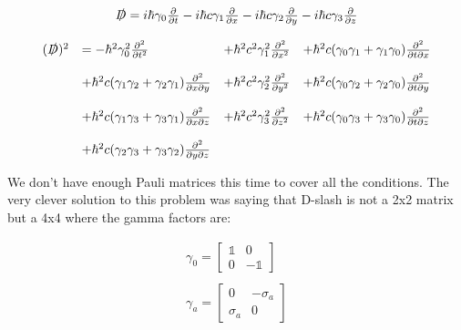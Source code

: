 \begin{equation}
  \begin{array}{c}
    \slashed{D} = i\hbar\gamma_0 \frac{\partial}{\partial t} - i\hbar c \gamma_1 \frac{\partial}{\partial x} - i\hbar c\gamma_2 \frac{\partial}{\partial y} - i\hbar c\gamma_3 \frac{\partial}{\partial z}
    \\

    \\
    \begin{array}{llll}
      (\slashed{D})^2 &= -\hbar^2 \gamma_0^2 \frac{\partial^2}{\partial t^2} &+ \hbar^2 c^2 \gamma_1^2 \frac{\partial^2}{\partial x^2} &+ \hbar^2 c (\gamma_0\gamma_1 + \gamma_1\gamma_0)\frac{\partial^2}{\partial t \partial x}
    \\

    \\
                    &+ \hbar^2 c (\gamma_1\gamma_2 + \gamma_2\gamma_1)\frac{\partial^2}{\partial x \partial y}  &+\hbar^2 c^2 \gamma_2^2 \frac{\partial^2}{\partial y^2}  &+ \hbar^2 c (\gamma_0\gamma_2 + \gamma_2\gamma_0)\frac{\partial^2}{\partial t \partial y}
    \\

    \\
                    &+\hbar^2 c (\gamma_1\gamma_3 + \gamma_3\gamma_1)\frac{\partial^2}{\partial x \partial z}  &+\hbar^2 c^2 \gamma_3^2 \frac{\partial^2}{\partial z^2} &+ \hbar^2 c (\gamma_0\gamma_3 + \gamma_3\gamma_0)\frac{\partial^2}{\partial t \partial z}
    \\

    \\
                    &+\hbar^2 c (\gamma_2\gamma_3 + \gamma_3\gamma_2)\frac{\partial^2}{\partial y \partial z}
    \end{array}
  \end{array}
\end{equation}

We don't have enough Pauli matrices this time to cover all the conditions. The very clever solution to this problem was saying that D-slash is not a 2x2 matrix but a 4x4 where the gamma factors are:

\begin{equation}
\begin{array}{c}
  \gamma_0 = \begin{bmatrix}
    \mathbb{1} & 0\\
    0 & -\mathbb{1}
  \end{bmatrix}
  \\

  \\
  \gamma_a = \begin{bmatrix}
    0 & -\sigma_a\\
    \sigma_a & 0
  \end{bmatrix}
\end{array}
\end{equation}


